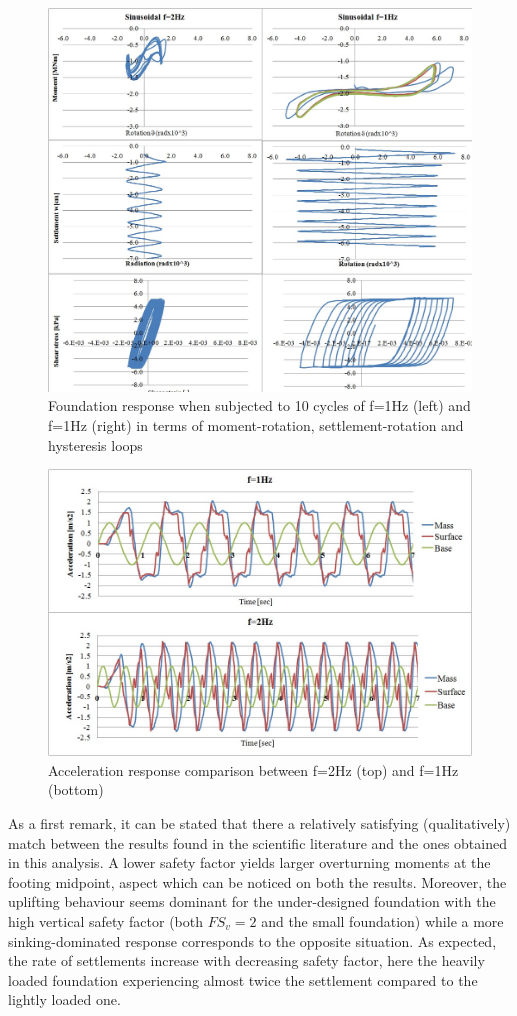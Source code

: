 \begin{figure}[!h]
	\centering
	\includegraphics[width=0.8\linewidth]{"2hz"}
	\caption{Foundation response when subjected to 10 cycles of f=1Hz (left) and f=1Hz (right) in terms of moment-rotation, settlement-rotation and hysteresis loops}
	\label{2hz}
\end{figure}
 
 \begin{figure}[!h]
 	\centering
 	\includegraphics[width=0.6\linewidth]{"acc-2hz"}
 	\caption{Acceleration response comparison between f=2Hz (top) and f=1Hz (bottom)}
 	\label{acc2hz}
 \end{figure}
 
 As a first remark, it can be stated that there a relatively satisfying (qualitatively) match between the results found in the scientific literature and the ones obtained in this analysis. A lower safety factor yields larger overturning moments at the footing midpoint, aspect which can be noticed on both the results. Moreover, the uplifting behaviour seems dominant for the under-designed foundation with the high vertical safety factor (both $FS_v=2$ and the small foundation) while a more sinking-dominated response corresponds to the opposite situation. As expected, the rate of settlements increase with decreasing safety factor, here the heavily loaded foundation experiencing almost twice the settlement compared to the lightly loaded one.
 
